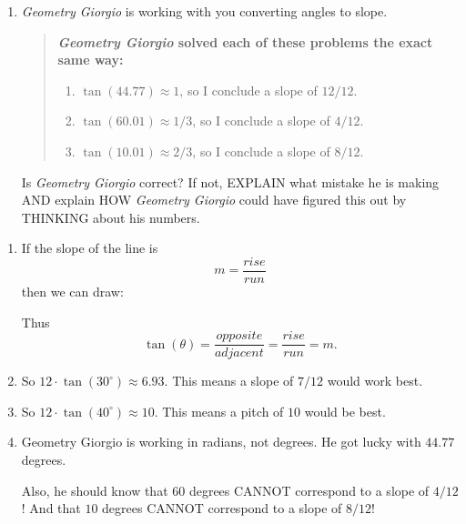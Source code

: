 \documentclass[noauthor,nooutcomes,hints,handout]{ximera}
\begin{document}
\begin{question}
\begin{enumerate}
\item \textit{Geometry Giorgio} is working with you converting angles
  to slope.
  \begin{quote} \textbf{\textit{Geometry Giorgio} solved
      each of these problems the exact same way:}
        \begin{enumerate}
        \item $\tan(44.77) \approx 1$, so I conclude a slope of $12/12$.
        \item $\tan(60.01) \approx 1/3$, so I conclude a slope of $4/12$.
        \item $\tan(10.01) \approx 2/3$, so I conclude a slope of $8/12$.
        \end{enumerate}
  \end{quote}
  Is \textit{Geometry Giorgio} correct? If not, EXPLAIN what mistake
  he is making AND explain HOW \textit{Geometry Giorgio} could have
  figured this out by THINKING about his numbers.
\end{enumerate}
\begin{freeResponse}
  \begin{enumerate}
  \item If the slope of the line is
    \[
    m = \frac{rise}{run}
    \]
    then we can draw:
    \begin{center}
    \end{center}
    Thus
    \[
    \tan(\theta) =\frac{opposite}{adjacent} = \frac{rise}{run} = m.
    \]
  \item So $12\cdot \tan(30^\circ) \approx 6.93$. This means a slope
    of $7/12$ would work best.

  \item So $12\cdot \tan(40^\circ)\approx 10$. This means a pitch of
    $10$ would be best.
  \item Geometry Giorgio is working in radians, not degrees.
    He got lucky with $44.77$ degrees.

    Also, he should know that $60$ degrees CANNOT correspond to a
    slope of $4/12$! And  that $10$ degrees CANNOT correspond to a
    slope of $8/12$!
  \end{enumerate}
  \end{freeResponse}
\end{question}
\end{document}

